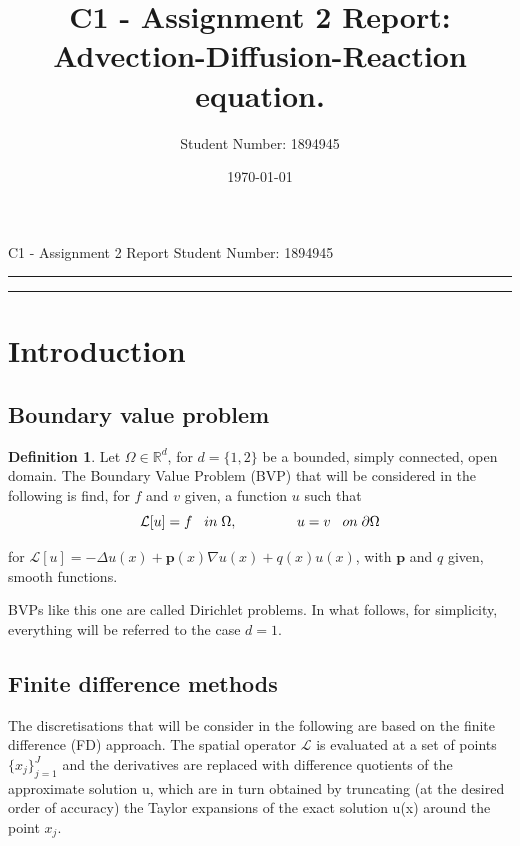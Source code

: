 \documentclass[11pt]{article}
\title{C1 - Assignment 2 Report: Advection-Diffusion-Reaction equation.} %
\author{Student Number: 1894945} %
\date{\today} %
\theoremstyle{theorem}
\theoremstyle{definition}
\newtheorem{definition}{Definition}
\begin{document}
\maketitle %

\begin{center}
C1 - Assignment 2 Report \hfill
Student Number: 1894945
\vspace{3pt} \hrule \vspace{3pt} \hrule
\end{center}

\tableofcontents

\clearpage



\section{Introduction}

\subsection{Boundary value problem}

\begin{definition}
	\label{defn:BVP}
	Let $\Omega\in\mathbb{R}^{d}$, for $d=\lbrace 1, 2\rbrace$ be a bounded, simply connected, open domain. The Boundary Value Problem (BVP) that will be considered in the following is find, for $f$ and $v$ given, a function $u$ such that 
	\begin{equation}
		\label{eqn:BVP}
		\mathcal{L}[u]=f\hspace{3mm}in\hspace{1mm}\Omega,\hspace{15mm}u=v\hspace{3mm}on\hspace{1mm}\partial\Omega
	\end{equation}
	
	for $\mathcal{L}[u]=-\Delta u(x) + \mathbf{p}(x)\nabla u(x) + q(x)u(x)$, with $\mathbf{p}$ and $q$ given, smooth functions. 
\end{definition}

BVPs like this one are called Dirichlet problems. In what follows, for simplicity, everything will be referred to the case $d=1$. 

\subsection{Finite difference methods}
The discretisations that will be consider in the following are based on the finite difference (FD) approach. The spatial operator $\mathcal{L}$ is evaluated at a set of points $\lbrace x_j\rbrace_{j=1}^{J}$ and the derivatives are replaced with difference quotients of the approximate solution u, which are in turn obtained by truncating (at the desired order of accuracy) the Taylor expansions of the exact solution u(x) around the point $x_j$.\\
\end{document}

